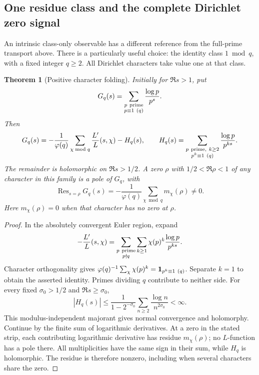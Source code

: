 \documentclass[11pt]{article}
\newtheorem{theorem}{Theorem}[section]
\theoremstyle{definition}
\begin{document}
\subsection{One residue class and the complete Dirichlet zero signal}

An intrinsic class-only observable has a different reference from the
full-prime transport above. There is a particularly useful choice: the
identity class $1\bmod q$, with a fixed integer $q\ge2$.
All Dirichlet characters take value one at that class.

\begin{theorem}[Positive character folding]\label{prop:identity-class-folding}
Initially for $\Re s>1$, put
\[
 G_q(s)=\sum_{\substack{p\ {\rm prime}\\p\equiv1\ (q)}}\frac{\log p}{p^s}.
\]
Then
\[
 G_q(s)=-\frac1{\varphi(q)}
       \sum_{\chi\bmod q}\frac{L'}{L}(s,\chi)-H_q(s),
 \qquad
 H_q(s)=\sum_{\substack{p\ {\rm prime},\ k\ge2\\p^k\equiv1\ (q)}}
                  \frac{\log p}{p^{ks}}.
\]
The remainder is holomorphic on $\Re s>1/2$. A zero $\rho$ with
$1/2<\Re\rho<1$ of any character in this family is a pole of $G_q$, with
\[
 \operatorname{Res}_{s=\rho}G_q(s)
   =-\frac1{\varphi(q)}\sum_{\chi\bmod q}m_\chi(\rho)\ne0.
\]
Here $m_\chi(\rho)=0$ when that character has no zero at $\rho$.
\end{theorem}

\begin{proof}
In the absolutely convergent Euler region, expand
\[
 -\frac{L'}L(s,\chi)
  =\sum_{\substack{p\ {\rm prime}\\p\nmid q}}\sum_{k\ge1}
          \chi(p)^k\frac{\log p}{p^{ks}}.
\]
Character orthogonality gives
$\varphi(q)^{-1}\sum_\chi\chi(p)^k
 ={\bf1}_{p^k\equiv1\ (q)}$.
Separate $k=1$ to obtain the asserted identity. Primes dividing $q$
contribute to neither side. For every fixed $\sigma_0>1/2$ and
$\Re s\ge\sigma_0$,
\[
 |H_q(s)|
 \le \frac1{1-2^{-\sigma_0}}
           \sum_{n\ge2}\frac{\log n}{n^{2\sigma_0}}<\infty.
\]
This modulus-independent majorant gives normal convergence and holomorphy.
Continue by the finite sum of logarithmic derivatives. At a zero in the
stated strip, each contributing logarithmic derivative has residue
$m_\chi(\rho)$; no $L$-function has a pole there. All multiplicities have
the same sign in their sum, while $H_q$ is holomorphic. The residue is
therefore nonzero, including when several characters share the zero.
\end{proof}
\end{document}
